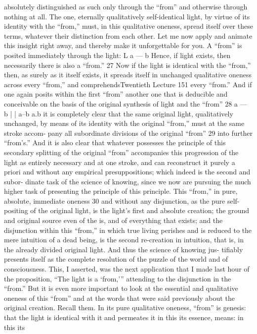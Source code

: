 absolutely distinguished as such only through the “from” and otherwise
through nothing at all. The one, eternally qualitatively self-identical light, by
virtue of its identity with the “from,” must, in this qualitative oneness, spread
itself over these terms, whatever their distinction from each other.
Let me now apply and animate this insight right away, and thereby make
it unforgettable for you. A “from” is posited immediately through the light:
L
a — b
Hence, if light exists, then necessarily there is also a “from.” 27 Now if the
light is identical with the “from,” then, as surely as it itself exists, it spreads
itself in unchanged qualitative oneness across every “from,” and comprehendsTwentieth Lecture
151
every “from.” And if one again posits within the first “from” another one that
is deducible and conceivable on the basis of the original synthesis of light and
the “from” 28
a — b
|
|
a–b a.b
it is completely clear that the same original light, qualitatively unchanged, by
means of its identity with the original “from,” must at the same stroke accom-
pany all subordinate divisions of the original “from” 29 into further “from’s.”
And it is also clear that whatever possesses the principle of this secondary
splitting of the original “from” accompanies this progression of the light as
entirely necessary and at one stroke, and can reconstruct it purely a priori and
without any empirical presuppositions; which indeed is the second and subor-
dinate task of the science of knowing, since we now are pursuing the much
higher task of presenting the principle of this principle. This “from,” in pure,
absolute, immediate oneness 30 and without any disjunction, as the pure self-
positing of the original light, is the light’s first and absolute creation; the
ground and original source even of the is, and of everything that exists; and the
disjunction within this “from,” in which true living perishes and is reduced to
the mere intuition of a dead being, is the second re-creation in intuition, that
is, in the already divided original light. And thus the science of knowing jus-
tifiably presents itself as the complete resolution of the puzzle of the world
and of consciousness.
This, I asserted, was the next application that I made last hour of the
proposition, “The light is a ‘from,’” attending to the disjunction in the “from.”
But it is even more important to look at the essential and qualitative oneness
of this “from” and at the words that were said previously about the original
creation. Recall them. In its pure qualitative oneness, “from” is genesis: that the
light is identical with it and permeates it in this its essence, means: in this its
